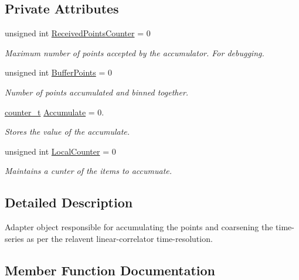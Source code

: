 \subsection*{Private Attributes}
\begin{DoxyCompactItemize}
\item 
unsigned int \hyperlink{classAccumulator_a9cc7c392e99778c99593f7798cb2ab3b}{Received\+Points\+Counter} = 0
\begin{DoxyCompactList}\small\item\em Maximum number of points accepted by the accumulator. For debugging. \end{DoxyCompactList}\item 
unsigned int \hyperlink{classAccumulator_a559e4fac031df015e47248599740b33c}{Buffer\+Points} = 0
\begin{DoxyCompactList}\small\item\em Number of points accumulated and binned together. \end{DoxyCompactList}\item 
\hyperlink{types_8hpp_ac89ac912f524b3e3fa3720ea55fec966}{counter\+\_\+t} \hyperlink{classAccumulator_a8e615af8b85dd2c8500d1f8c473879ab}{Accumulate} = 0.
\begin{DoxyCompactList}\small\item\em Stores the value of the accumulate. \end{DoxyCompactList}\item 
unsigned int \hyperlink{classAccumulator_a753e3878c3078a11ee9bc13b6185ec60}{Local\+Counter} = 0
\begin{DoxyCompactList}\small\item\em Maintains a cunter of the items to accumuate. \end{DoxyCompactList}\end{DoxyCompactItemize}


\subsection{Detailed Description}
Adapter object responsible for accumulating the points and coarsening the time-\/series as per the relavent linear-\/correlator time-\/resolution. 

\subsection{Member Function Documentation}
\mbox{\label{classAccumulator_aa1793bc1599bc2451fabc44954673164}} 
